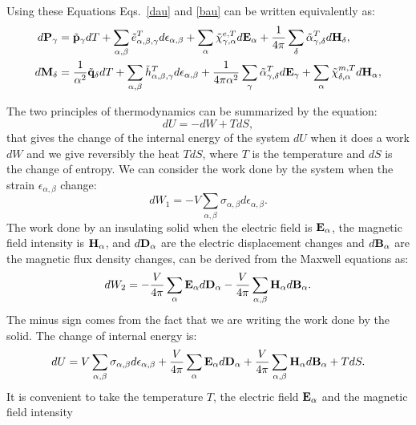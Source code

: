 \documentclass[12pt,a4paper]{article}
\begin{document}
{Using these Equations Eqs.~\ref{dau} and \ref{bau} can be written
equivalently as:
\begin{align}
d{\bf P}_\gamma&=
\tilde {\bf p}_\gamma dT + \sum_{\alpha,\beta} \tilde 
e^T_{\alpha,\beta,\gamma} d\epsilon_{\alpha,\beta}
+ \sum_\alpha \tilde \chi^{e,T}_{\gamma,\alpha} 
d{\bf E}_{\alpha} + {1\over 4 \pi}
\sum_\delta \tilde \alpha^T_{\gamma,\delta} d{\bf H}_{\delta}, \\
d{\bf M}_\delta&=
{1\over \alpha^2}\tilde {\bf q}_\delta dT+ \sum_{\alpha,\beta}
\tilde h^T_{\alpha,\beta,\gamma}
d\epsilon_{\alpha,\beta}
+{1\over 4 \pi \alpha^2} \sum_\gamma \tilde \alpha^T_{\gamma,\delta}
d{\bf E}_{\gamma}+ 
\sum_\alpha \tilde \chi^{m,T}_{\delta,\alpha}
d{\bf H}_{\alpha}, 
\end{align}
}

\newpage
{\color{orange}
The two principles of thermodynamics can be summarized by the equation:
\begin{equation}
dU = -dW + T dS,
\end{equation}
that gives the change of the internal energy of the system $dU$ when
it does a work $dW$ and we give reversibly the heat $T dS$, where $T$ 
is the temperature and $dS$ is the change of entropy.
We can consider the work done by the system when the strain
$\epsilon_{\alpha,\beta}$ change:
\begin{equation}
dW_1 =-V \sum_{\alpha,\beta} \sigma_{\alpha,\beta} d \epsilon_{\alpha,\beta}. 
\end{equation}
The work done by an insulating solid when the electric field is 
${\bf E}_\alpha$, the magnetic field intensity is ${\bf H}_\alpha$, 
and $d {\bf D}_\alpha$ are the electric displacement changes and 
$d {\bf B}_\alpha$ are the magnetic flux density changes, can be derived
from the Maxwell equations as: 
\begin{equation}
dW_2 = -{V \over 4 \pi} \sum_\alpha {\bf E}_\alpha d {\bf D}_\alpha 
-{V \over 4 \pi} \sum_{\alpha,\beta} {\bf H}_{\alpha} d {\bf B}_\alpha.
\end{equation}
The minus sign comes from the fact that we are writing the work done by the
solid. The change of internal energy is:
\begin{equation}
dU = V \sum_{\alpha,\beta} \sigma_{\alpha,\beta} d \epsilon_{\alpha,\beta}
+ {V \over 4 \pi} \sum_\alpha {\bf E}_\alpha d {\bf D}_\alpha + 
{V \over 4 \pi} \sum_{\alpha,\beta} {\bf H}_{\alpha} d {\bf B}_\alpha + T dS.
\end{equation}
It is convenient to take the temperature $T$,
the electric field ${\bf E}_\alpha$ and the magnetic field intensity
}
\end{document}
